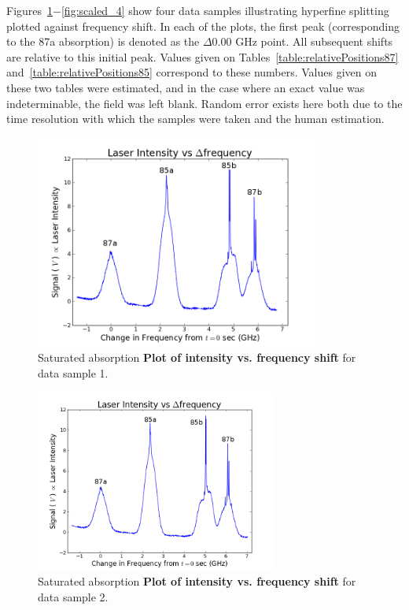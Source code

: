 \documentclass[paper=a4, fontsize=11pt]{scrartcl} %
\numberwithin{equation}{section}
\numberwithin{figure}{section}
\numberwithin{table}{section}
\begin{document}

Figures~\ref{fig:scaled_1}$-$\ref{fig:scaled_4} show four data samples illustrating hyperfine splitting plotted against frequency shift. In each of the plots, the first peak (corresponding to the 87a absorption) is denoted as the $\Delta 0.00$ GHz point. All subsequent shifts are relative to this initial peak. Values given on Tables~\ref{table:relativePositions87} and~\ref{table:relativePositions85} correspond to these numbers. Values given on these two tables were estimated, and in the case where an exact value was indeterminable, the field was left blank. Random error exists here both due to the time resolution with which the samples were taken and the human estimation.

\begin{figure}[H] \begin{center}
  \includegraphics[height=70mm]{4-2-009.png}
  \caption{Saturated absorption \textbf{Plot of intensity vs. frequency shift} for data sample 1. }
  \label{fig:scaled_1}
\end{center} \end{figure}

\begin{figure}[H] \begin{center}
  \includegraphics[height=60mm]{4-2-010.png}
  \caption{Saturated absorption \textbf{Plot of intensity vs. frequency shift} for data sample 2. }
  \label{fig:scaled_2}
\end{center} \end{figure}
\end{document}
